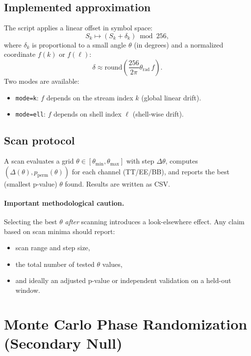 \documentclass[11pt,a4paper]{article}
\begin{document}
\subsection{Implemented approximation}
The script applies a linear offset in symbol space:
\begin{equation}
S_k \mapsto (S_k + \delta_k)\bmod 256,
\end{equation}
where $\delta_k$ is proportional to a small angle $\theta$ (in degrees) and a
normalized coordinate $f(k)$ or $f(\ell)$:
\begin{equation}
\delta \approx \mathrm{round}\!\left(\frac{256}{2\pi}\theta_{\mathrm{rad}}\, f\right).
\end{equation}
Two modes are available:
\begin{itemize}
\item \texttt{mode=k}: $f$ depends on the stream index $k$ (global linear drift).
\item \texttt{mode=ell}: $f$ depends on shell index $\ell$ (shell-wise drift).
\end{itemize}

\subsection{Scan protocol}
A scan evaluates a grid $\theta\in[\theta_{\min},\theta_{\max}]$ with step $\Delta\theta$,
computes $(\Delta(\theta), p_{\mathrm{perm}}(\theta))$ for each channel (TT/EE/BB),
and reports the best (smallest p-value) $\theta$ found. Results are written as CSV.

\paragraph{Important methodological caution.}
Selecting the best $\theta$ \emph{after} scanning introduces a look-elsewhere effect.
Any claim based on scan minima should report:
\begin{itemize}
\item scan range and step size,
\item the total number of tested $\theta$ values,
\item and ideally an adjusted p-value or independent validation on a held-out window.
\end{itemize}

\section{Monte Carlo Phase Randomization (Secondary Null)}
\end{document}
